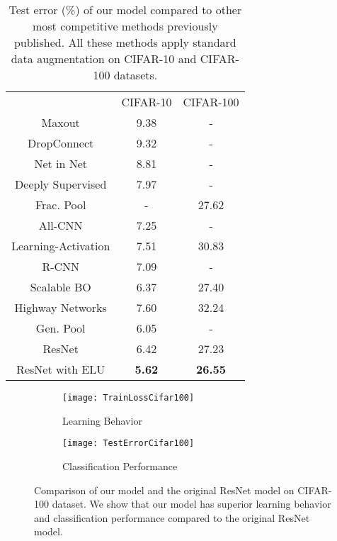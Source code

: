 \documentclass[10pt,twocolumn,letterpaper]{article}
\begin{document}
\setlength{\tabcolsep}{4pt}
\begin{table}
    \centering
    \caption{Test error (\%) of our model compared to other most competitive methods previously published. All these methods apply standard data augmentation on CIFAR-10 and CIFAR-100 datasets.}
    \label{table:CifarDatasetCompare}
    \begin{tabular}{c c c}
        \hline \noalign{\smallskip}
         & CIFAR-10 & CIFAR-100 \\
        \noalign{\smallskip}
        \hline
        \noalign{\smallskip}
        Maxout \cite{[20]}               &   9.38     &  -    \\
        DropConnect \cite{[19]}          &   9.32     &  -    \\
        Net in Net  \cite{[21]}          &   8.81     &  -    \\
        Deeply Supervised \cite{[18]}    &   7.97     &  -    \\
        Frac. Pool \cite{[22]}           &    -       & 27.62 \\
        All-CNN \cite{[16]}              &   7.25     &  -    \\
        Learning-Activation \cite{[23]}  &   7.51     & 30.83 \\
        R-CNN \cite{[24]}                &   7.09     &  -    \\
        Scalable BO \cite{[25]}          &   6.37     & 27.40 \\
        Highway Networks \cite{[26]}     &   7.60     & 32.24 \\
        Gen. Pool \cite{[27]}            &   6.05     &  -    \\
        \noalign{\smallskip}
        \hline
        ResNet \cite{[1]}               &   6.42     & 27.23 \\
        ResNet with ELU       &   \textbf{5.62}     & \textbf{26.55} \\
        \hline
    \end{tabular}
\end{table}

\begin{figure}
    \centering
    \begin{subfigure}{.23\textwidth}
        \centering
        \texttt{[image: TrainLossCifar100]}
        \caption{Learning Behavior}
        \label{fig:Cifar100TrainLoss}
    \end{subfigure}
    \begin{subfigure}{.23\textwidth}
        \centering
        \texttt{[image: TestErrorCifar100]}
        \caption{Classification Performance}
        \label{fig:Cifar100TestError}
    \end{subfigure}
    \caption{Comparison of our model and the original ResNet model on CIFAR-100 dataset. We show that our model has superior learning behavior and classification performance compared to the original ResNet model.}
    \label{fig:Cifar100}
\end{figure}
\end{document}
